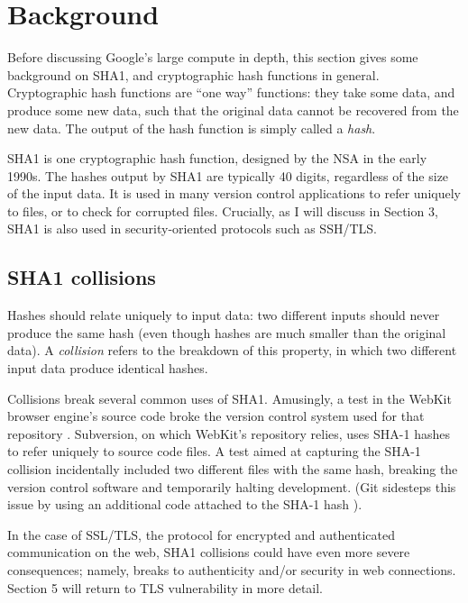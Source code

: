 \documentclass[sigconf]{acmart}
\begin{document}
\section{Background}
\label{sec:org79d5f75}


Before discussing Google's large compute in depth,
this section gives some background on SHA1, and cryptographic hash functions in general.
Cryptographic hash functions are ``one way'' functions: 
they take some data, and produce some new data, such that the original data cannot be recovered from the new data. The output of the hash function is simply called a \emph{hash}.

SHA1 is one cryptographic hash function, designed by the NSA in the early 1990s.
The hashes output by SHA1 are typically 40 digits, regardless of the size of the input data.
It is used in many version control applications to refer uniquely to files, 
or to check for corrupted files. 
Crucially, as I will discuss in Section 3, SHA1 is also used in security-oriented protocols such as SSH/TLS.


\subsection{SHA1 collisions}
\label{sec:org67ccb05}

Hashes should relate uniquely to input data: 
two different inputs should never produce the same hash (even though hashes are much smaller than the original data).
A \emph{collision} refers to the breakdown of this property,
in which two different input data produce identical hashes.

Collisions break several common uses of SHA1. 
Amusingly, a test in the WebKit browser engine's source code
broke the version control system used for that repository \cite{Koivisto2017}.
Subversion, on which WebKit's repository relies, uses SHA-1 hashes to refer uniquely to source code files.
A test aimed at capturing the SHA-1 collision incidentally included two different files with the same hash, 
breaking the version control software and temporarily halting development.
(Git sidesteps this issue by using an additional code  attached to the SHA-1 hash \cite{Torvalds2017}).

In the case of SSL/TLS, the protocol for encrypted and authenticated communication on the web, SHA1 collisions could have even more severe consequences;
namely, breaks to authenticity and/or security in web connections.
Section 5 will return to TLS vulnerability in more detail.
\end{document}
